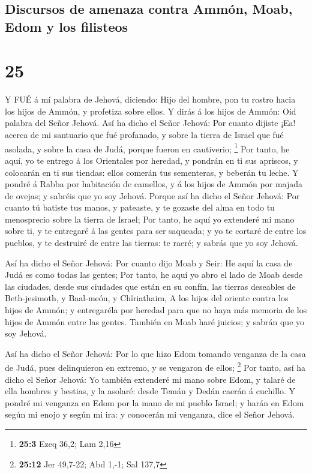 \hypertarget{discursos-de-amenaza-contra-ammuxf3n-moab-edom-y-los-filisteos}{%
\subsection{Discursos de amenaza contra Ammón, Moab, Edom y los
filisteos}\label{discursos-de-amenaza-contra-ammuxf3n-moab-edom-y-los-filisteos}}

\hypertarget{section-24}{%
\section{25}\label{section-24}}

 Y FUÉ á mí palabra de Jehová, diciendo:  Hijo
del hombre, pon tu rostro hacia los hijos de Ammón, y profetiza sobre
ellos.  Y dirás á los hijos de Ammón: Oid palabra del Señor
Jehová. Así ha dicho el Señor Jehová: Por cuanto dijiste ¡Ea! acerca de
mi santuario que fué profanado, y sobre la tierra de Israel que fué
asolada, y sobre la casa de Judá, porque fueron en cautiverio;
\footnote{\textbf{25:3} Ezeq 36,2; Lam 2,16}  Por tanto, he
aquí, yo te entrego á los Orientales por heredad, y pondrán en ti sus
apriscos, y colocarán en ti sus tiendas: ellos comerán tus sementeras, y
beberán tu leche.  Y pondré á Rabba por habitación de
camellos, y á los hijos de Ammón por majada de ovejas; y sabréis que yo
soy Jehová.  Porque así ha dicho el Señor Jehová: Por cuanto
tú batiste tus manos, y pateaste, y te gozaste del alma en todo tu
menosprecio sobre la tierra de Israel;  Por tanto, he aquí
yo extenderé mi mano sobre ti, y te entregaré á las gentes para ser
saqueada; y yo te cortaré de entre los pueblos, y te destruiré de entre
las tierras: te raeré; y sabrás que yo soy Jehová.

 Así ha dicho el Señor Jehová: Por cuanto dijo Moab y Seir:
He aquí la casa de Judá es como todas las gentes;  Por
tanto, he aquí yo abro el lado de Moab desde las ciudades, desde sus
ciudades que están en su confín, las tierras deseables de Beth-jesimoth,
y Baal-meón, y Chîriathaim,  A los hijos del oriente contra
los hijos de Ammón; y entregaréla por heredad para que no haya más
memoria de los hijos de Ammón entre las gentes.  También en
Moab haré juicios; y sabrán que yo soy Jehová.

 Así ha dicho el Señor Jehová: Por lo que hizo Edom tomando
venganza de la casa de Judá, pues delinquieron en extremo, y se vengaron
de ellos; \footnote{\textbf{25:12} Jer 49,7-22; Abd 1,-1; Sal 137,7}
 Por tanto, así ha dicho el Señor Jehová: Yo también
extenderé mi mano sobre Edom, y talaré de ella hombres y bestias, y la
asolaré: desde Temán y Dedán caerán á cuchillo.  Y pondré
mi venganza en Edom por la mano de mi pueblo Israel; y harán en Edom
según mi enojo y según mi ira: y conocerán mi venganza, dice el Señor
Jehová.

